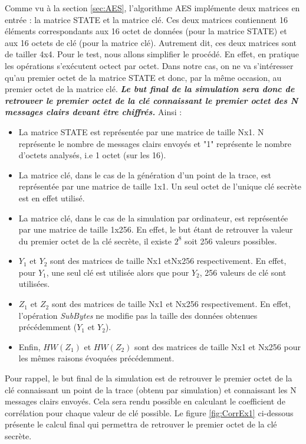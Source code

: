 \documentclass[10pt, oneside, a4paper]{article}
\begin{document}
\vspace{-0.3 cm}Comme vu à la section \ref{sec:AES}, l'algorithme AES implémente deux matrices en entrée : la matrice STATE et la matrice clé. Ces deux matrices contiennent 16 éléments correspondants aux 16 octet de données (pour la matrice STATE) et aux 16 octets de clé (pour la matrice clé). Autrement dit, ces deux matrices sont de tailler 4x4. Pour le test, nous allons simplifier le procédé. En effet, en pratique les opérations s'exécutent octect par octet. Dans notre cas, on ne va s'intéresser qu'au premier octet de la matrice STATE et donc, par la même occasion, au premier octet de la matrice clé. \textbf{\textit{Le but final de la simulation sera donc de retrouver le premier octet de la clé connaissant le premier octet des N messages clairs devant être chiffrés.}}
Ainsi :
\begin{itemize}
\item La matrice STATE est représentée par une matrice de taille Nx1. N représente le nombre de messages clairs envoyés et "1" représente le nombre d'octets analysés, i.e 1 octet (sur les 16).
\item La matrice clé, dans le cas de la génération d'un point de la trace, est représentée par une matrice de taille 1x1. Un seul octet de l'unique clé secrète est en effet utilisé.
\item La matrice clé, dans le cas de la simulation par ordinateur, est représentée par une matrice de taille 1x256. En effet, le but étant de retrouver la valeur du premier octet de la clé secrète, il existe $2^8$ soit 256 valeurs possibles.
\item $Y_1$ et $Y_2$ sont des matrices de taille Nx1 etNx256 respectivement. En effet, pour $Y_1$, une seul clé est utilisée alors que pour $Y_2$, 256 valeurs de clé sont utilisées.
\item $Z_1$ et $Z_2$ sont des matrices de taille Nx1 et Nx256 respectivement. En effet, l'opération \textit{SubBytes} ne modifie pas la taille des données obtenues précédemment ($Y_1$ et $Y_2$).
\item Enfin, $HW(Z_1)$ et $HW(Z_2)$ sont des matrices de taille Nx1 et Nx256 pour les mêmes raisons évoquées précédemment. \\
\end{itemize}

\vspace{-0.2 cm}Pour rappel, le but final de la simulation est de retrouver le premier octet de la clé connaissant un point de la trace (obtenu par simulation) et connaissant les N messages clairs envoyés. Cela sera rendu possible en calculant le coefficient de corrélation pour chaque valeur de clé possible. Le figure \ref{fig:CorrEx1} ci-dessous présente le calcul final qui permettra de retrouver le premier octet de la clé secrète.
\end{document}
